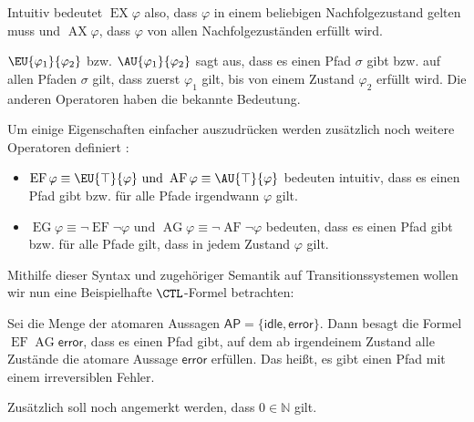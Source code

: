 Intuitiv bedeutet $\operatorname{EX}\varphi$ also, dass $\varphi$ in einem beliebigen Nachfolgezustand gelten muss und $\operatorname{AX}\varphi$, dass $\varphi$ von allen Nachfolgezuständen erfüllt wird.

$\EU{\varphi_1}{\varphi_2}$ bzw. $\AU{\varphi_1}{\varphi_2}$ sagt aus, dass es einen Pfad $\sigma$ gibt bzw. auf allen Pfaden $\sigma$ gilt, dass zuerst $\varphi_1$ gilt, bis von einem Zustand $\varphi_2$ erfüllt wird.
Die anderen Operatoren haben die bekannte Bedeutung.

Um einige Eigenschaften einfacher auszudrücken werden zusätzlich noch weitere Operatoren definiert \cite{clarke1982design}:
\begin{itemize}
	\item $\operatorname{EF}\varphi \equiv \EU{\top}{\varphi}\text{ und }\operatorname{AF}\varphi \equiv \AU{\top}{\varphi}$ bedeuten intuitiv, dass es einen Pfad gibt bzw. für alle Pfade irgendwann $\varphi$ gilt.
	\item $\operatorname{EG}\varphi \equiv \neg\operatorname{EF}\neg\varphi\text{ und }\operatorname{AG}\varphi \equiv \neg\operatorname{AF}\neg\varphi$ bedeuten, dass es einen Pfad gibt bzw. für alle Pfade gilt, dass in jedem Zustand $\varphi$ gilt.
\end{itemize}
Mithilfe dieser Syntax und zugehöriger Semantik auf Transitionssystemen wollen wir nun eine Beispielhafte $\CTL$-Formel betrachten:
\begin{example}
	Sei die Menge der atomaren Aussagen $\mathsf{AP}=\{\mathsf{idle}, \mathsf{error}\}$.
	Dann besagt die Formel $\operatorname{EF}\operatorname{AG}\mathsf{error}$, dass es einen Pfad gibt, auf dem ab irgendeinem Zustand alle Zustände die atomare Aussage $\mathsf{error}$ erfüllen. 
	Das heißt, es gibt einen Pfad mit einem irreversiblen Fehler.
\end{example}

Zusätzlich soll noch angemerkt werden, dass $0\in \mathbb{N}$ gilt.